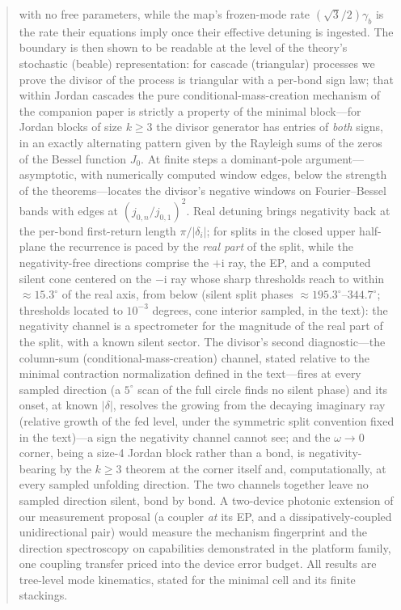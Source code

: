 ﻿\documentclass[11pt]{article}
\newcommand{\ii}{\mathrm{i}}
\theoremstyle{remark}
\begin{document}
\begin{abstract}
with no free parameters, while the map's frozen-mode rate
$(\sqrt3/2)\gamma_b$ is the rate their equations imply once their
effective detuning is ingested.
The boundary is then shown to be readable at the level of the
theory's stochastic (beable) representation: for cascade
(triangular) processes we prove the divisor of the process is
triangular with a per-bond sign law; that within Jordan cascades
the pure conditional-mass-creation mechanism of the companion paper
is strictly a property of the minimal block---for Jordan blocks of
size $k\ge3$ the divisor generator has entries of \emph{both}
signs, in an exactly alternating pattern given by the Rayleigh sums
of the zeros of the Bessel function $J_0$. At finite steps a
dominant-pole argument---asymptotic, with numerically computed
window edges, below the strength of the theorems---locates
the divisor's negative windows on Fourier--Bessel
bands with edges at $(j_{0,n}/j_{0,1})^2$. Real detuning brings
negativity back at the per-bond first-return length
$\pi/|\delta_i|$; for splits in the closed upper half-plane the
recurrence is paced by the \emph{real part} of the split, while
the negativity-free directions comprise the $+\ii$ ray, the EP,
and a computed silent cone centered on the $-\ii$ ray whose sharp
thresholds reach to within ${\approx}15.3^\circ$ of the real
axis, from below (silent split phases ${\approx}195.3^\circ$--$344.7^\circ$; thresholds
located to $10^{-3}$ degrees, cone interior sampled, in the text): the
negativity channel is a spectrometer for the magnitude of the real
part of the split, with a known silent sector. The divisor's second
diagnostic---the column-sum (conditional-mass-creation) channel,
stated relative to the minimal contraction normalization defined
in the text---fires at every sampled direction (a $5^\circ$ scan
of the full circle finds no silent phase) and its onset, at known
$|\delta|$, resolves the growing from the decaying imaginary ray
(relative growth of the fed level, under the symmetric split
convention fixed in the text)---a sign the negativity channel
cannot see; and the $\omega\to0$ corner, being a size-4 Jordan
block rather than a bond, is negativity-bearing by the $k\ge3$
theorem at the corner itself and, computationally, at every
sampled unfolding direction. The two channels together leave no
sampled direction silent, bond by bond. A two-device photonic
extension of our measurement proposal (a coupler \emph{at} its EP,
and a dissipatively-coupled unidirectional pair) would measure the
mechanism fingerprint and the direction spectroscopy on
capabilities demonstrated in the platform family, one coupling
transfer priced into the device error budget. All results are tree-level mode kinematics, stated for
the minimal cell and its finite stackings.
\end{abstract}
\end{document}
